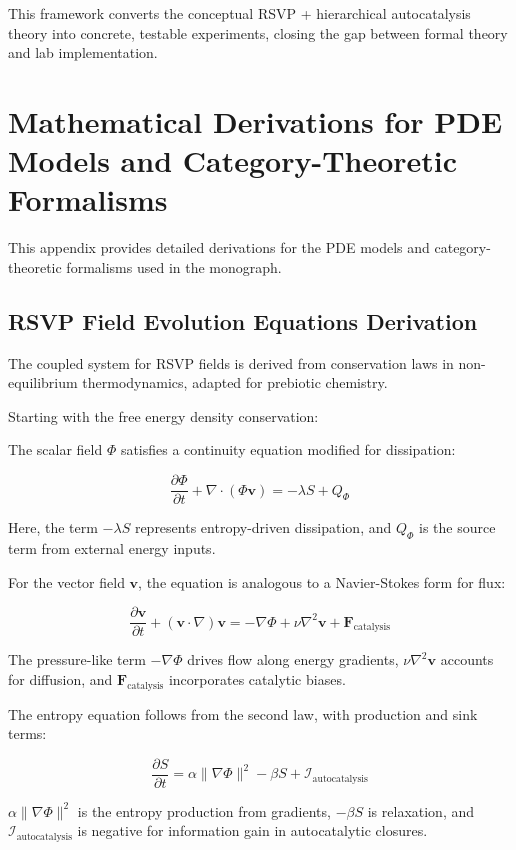 \documentclass[openany]{book}
\begin{document}
This framework converts the conceptual RSVP + hierarchical autocatalysis theory into concrete, testable experiments, closing the gap between formal theory and lab implementation.

\appendix

\chapter{Mathematical Derivations for PDE Models and Category-Theoretic Formalisms}
This appendix provides detailed derivations for the PDE models and category-theoretic formalisms used in the monograph.

\section{RSVP Field Evolution Equations Derivation}
The coupled system for RSVP fields is derived from conservation laws in non-equilibrium thermodynamics, adapted for prebiotic chemistry.

Starting with the free energy density conservation:

The scalar field $\Phi$ satisfies a continuity equation modified for dissipation:

\[\frac{\partial \Phi}{\partial t} + \nabla \cdot (\Phi \mathbf{v}) = - \lambda S + Q_\Phi\]

Here, the term $- \lambda S$ represents entropy-driven dissipation, and $Q_\Phi$ is the source term from external energy inputs.

For the vector field $\mathbf{v}$, the equation is analogous to a Navier-Stokes form for flux:

\[\frac{\partial \mathbf{v}}{\partial t} + (\mathbf{v} \cdot \nabla) \mathbf{v} = - \nabla \Phi + \nu \nabla^2 \mathbf{v} + \mathbf{F}_{\text{catalysis}}\]

The pressure-like term $-\nabla \Phi$ drives flow along energy gradients, $\nu \nabla^2 \mathbf{v}$ accounts for diffusion, and $\mathbf{F}_{\text{catalysis}}$ incorporates catalytic biases.

The entropy equation follows from the second law, with production and sink terms:

\[\frac{\partial S}{\partial t} = \alpha \|\nabla \Phi\|^2 - \beta S + \mathcal{I}_{\text{autocatalysis}}\]

$\alpha \|\nabla \Phi\|^2$ is the entropy production from gradients, $-\beta S$ is relaxation, and $\mathcal{I}_{\text{autocatalysis}}$ is negative for information gain in autocatalytic closures.
\end{document}
